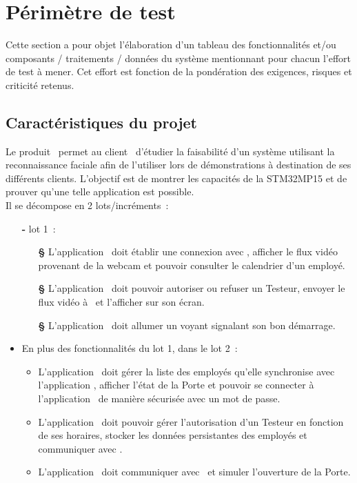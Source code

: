 
\section{Périmètre de test}
\label{sec:perimetre}

Cette section a pour objet l’élaboration d’un tableau des fonctionnalités et/ou composants / traitements / données du système mentionnant pour chacun l’effort de test à mener.
Cet effort est fonction de la pondération des exigences, risques et criticité retenus.

\subsection{Caractéristiques du projet}
\label{sec:peri:caract}

Le produit \produit~permet au client \client~d'étudier la faisabilité d'un système utilisant la reconnaissance faciale afin de l'utiliser lors de démonstrations à destination de ses différents clients.
L’objectif est de montrer les capacités de la STM32MP15 et de prouver qu'une telle application est possible.\\
Il se décompose en 2 lots/incréments~:
\begin{itemize}
    \item [\textbf{-}] lot 1~: 
        \begin {itemize}
            \item [\textbf{§}] L'application \appliA~doit établir une connexion avec \appliLin, afficher le flux vidéo provenant de la webcam et pouvoir consulter le calendrier d'un employé.
            \item [\textbf{§}] L'application \appliLin~doit pouvoir autoriser ou refuser un Testeur, envoyer le flux vidéo à \appliA~et l'afficher sur son écran.
            \item [\textbf{§}] L'application \appliPo~doit allumer un voyant signalant son bon démarrage.
        \end{itemize}
    \item [\textbf{-}] En plus des fonctionnalités du lot 1, dans le lot 2~: 
        \begin {itemize}
            \item [\textbf{§}] L'application \appliA~doit gérer la liste des employés qu'elle synchronise avec l'application \appliLin, afficher l'état de la Porte et pouvoir se connecter à l'application \appliLin~de manière sécurisée avec un mot de passe.
            \item [\textbf{§}] L'application \appliLin~doit pouvoir gérer l'autorisation d'un Testeur en fonction de ses horaires, stocker les données persistantes des employés et communiquer avec \appliPo.
            \item [\textbf{§}] L'application \appliPo~doit communiquer avec \appliLin~et simuler l'ouverture de la Porte.\\
        \end{itemize}
\end{itemize}

